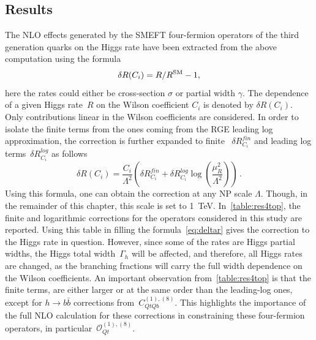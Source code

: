 	\subsection{Results}
	The NLO effects generated by the SMEFT four-fermion operators of the third generation quarks on the Higgs rate have been extracted from the above computation using the formula
	\begin{equation}
		\delta R(C_i) = R/R^{\mathrm{SM}} -1,
		\label{eq:deltaR}
	\end{equation}
	here the rates could either be cross-section $\sigma$ or partial width $\gamma$. The dependence of a given Higgs rate~$R$ on the Wilson coefficient $C_i$ is denoted by $\delta R(C_i) $.  Only contributions linear in the Wilson coefficients are considered. In order to isolate the finite terms from the ones coming from the RGE leading log approximation, the correction is further expanded to finite ~$\delta R_{C_i}^{fin}$ and leading log terms~$\delta R_{C_i}^{log}$ as follows
	\begin{equation}
		\delta R(C_i)= \frac{C_i}{\Lambda^2}\left(\delta R_{C_i}^{fin}+ \delta R_{C_i}^{log} \log\left(\frac{\mu_R^2}{\Lambda^2}\right)\right)\,.
		\label{eq:deltar}
	\end{equation}
	Using this formula, one can obtain the correction at any NP scale $\Lambda$. Though, in the remainder of this chapter, this scale is set to \SI{1}{TeV}. In~\autoref{table:res4top}, the finite and logarithmic corrections for the operators considered in this study are reported. Using this table in filling the formula~\eqref{eq:deltar} gives the correction to the Higgs rate in question.  However, since some of the rates are Higgs partial widths, the Higgs total width~$\Gamma_h$ will be affected, and therefore, all Higgs rates are changed, as the branching fractions will carry the full width dependence on the Wilson coefficients.
	An important observation from~\autoref{table:res4top} is that the finite terms, are either larger or at the same order than the leading-log ones, except for $h\to b\bar{b}$ corrections from~$C_{QtQb}^{(1),(8)}$. This highlights the importance of the full NLO calculation for these corrections in constraining these four-fermion operators, in particular~$\mathcal O_{Qt}^{(1),(8)}$.
	
